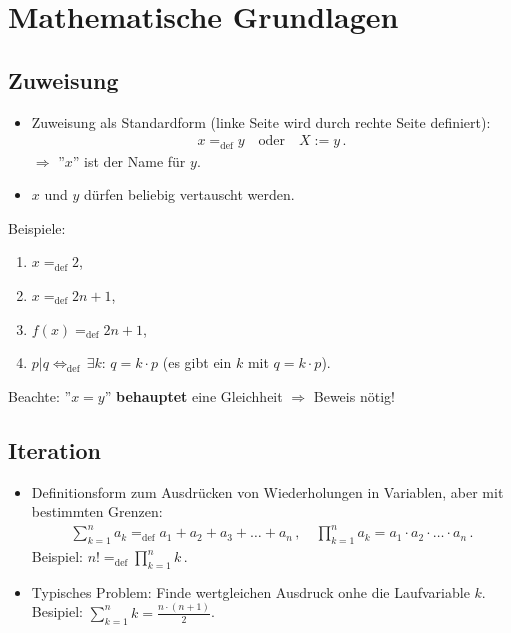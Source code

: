 \documentclass[12pt]{book}													%
\newcommand{\bma}{\begin{eqnarray}}
\newcommand{\ema}{\end{eqnarray}\hspace{-0.015cm}}
\newcommand{\Def}{_{\text{def}}}
\begin{document}
\thispagestyle{empty}
\setlength{\parindent}{0pt}
\vspace{2.5cm}
{\bf \fontsize{36}{36} \selectfont {Diskrete Mathematik und }}\\[5mm]
{\bf \fontsize{36}{36} \selectfont {Logik}}\\[1cm]
{\fontsize{14}{18} \selectfont  {Universität Konstanz, Wintersemester 2022/23}}\\[1cm]
{\fontsize{18}{22} \selectfont  {Dozent: Prof.\ Dr.\ Sven Kosub}}\\[.5cm]
{\fontsize{18}{22} \selectfont  {Ausarbeitung: Dr.\ Matthias Droth}}\\[.5cm]
\newpage
\thispagestyle{empty}
\setcounter{secnumdepth}{2}
\setcounter{tocdepth}{3}
\tableofcontents
\setlength{\parindent}{0.0cm}			%
\parskip=0.3cm						%
\chapter{Mathematische Grundlagen}
%
\section{Zuweisung}
\begin{itemize}
\item Zuweisung als Standardform (linke Seite wird durch rechte Seite definiert):
\bma
x=\Def y\quad\text{oder}\quad X:=y\,.
\ema
$\Rightarrow$ ''$x$'' ist der Name für $y$.
\item $x$ und $y$ dürfen beliebig vertauscht werden.
\end{itemize}
Beispiele:
\begin{enumerate}
\item $x=\Def2$,
\item $x=\Def 2n+1$,
\item $f(x)=\Def 2n+1$,
\item $p|q\Leftrightarrow\Def\,\exists k:\,q=k\cdot p$ (es gibt ein $k$ mit $q=k\cdot p$).
\end{enumerate}
Beachte: ''$x=y$'' \textbf{behauptet} eine Gleichheit $\Rightarrow$ Beweis nötig!
%
\section{Iteration}
\begin{itemize}
\item Definitionsform zum Ausdrücken von Wiederholungen in Variablen, aber mit bestimmten Grenzen:
\bma
\sum_{k=1}^na_k=\Def a_1+a_2+a_3+\ldots+a_n\,,\quad\prod_{k=1}^na_k=a_1\cdot a_2\cdot\ldots\cdot a_n\,.
\ema
Beispiel: $n!=\Def\prod_{k=1}^nk\,$.
\item Typisches Problem: Finde wertgleichen Ausdruck onhe die Laufvariable $k$.\\Besipiel: $\sum_{k=1}^nk=\frac{n\cdot(n+1)}{2}$. 
\end{itemize}
%
\end{document}
